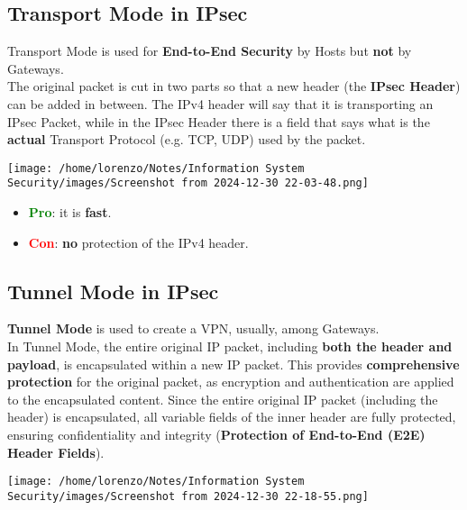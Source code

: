 \subsection{Transport Mode in IPsec}
\begin{minipage}{0.6\textwidth}
Transport Mode is used for \textbf{End-to-End Security} by Hosts but \textbf{not} by Gateways.\\
The original packet is cut in two parts so that a new header (the \textbf{IPsec Header}) can be added
in between. The IPv4 header will say that it is transporting an IPsec Packet, while in the IPsec
Header there is a field that says what is the \textbf{actual} Transport Protocol (e.g. TCP, UDP) used
by the packet. 
\end{minipage} 
\hspace{0.3cm}
\begin{minipage}{0.4\textwidth}
    \centering
    \texttt{[image: /home/lorenzo/Notes/Information System Security/images/Screenshot from 2024-12-30 22-03-48.png]}
\end{minipage}
\begin{itemize}
    \item \textcolor{green}{\textbf{Pro}}: it is \textbf{fast}.
    \item \textcolor{red}{\textbf{Con}}: \textbf{no} protection of the IPv4 header. 
\end{itemize}

\subsection{Tunnel Mode in IPsec}
\begin{minipage}{0.6\textwidth}
\textbf{Tunnel Mode} is used to create a VPN, usually, among Gateways.\\
In Tunnel Mode, the entire original IP packet, including \textbf{both the header and payload}, is encapsulated within a new IP packet. This provides \textbf{comprehensive protection} for the original packet, as encryption and authentication are applied to the encapsulated content.
Since the entire original IP packet (including the header) is encapsulated, all variable fields of
the inner header are fully protected, ensuring confidentiality and integrity (\textbf{Protection of End-to-End (E2E) Header Fields}). 
\end{minipage} 
\hspace{0.5cm}
\begin{minipage}{0.4\textwidth}
    \centering
    \texttt{[image: /home/lorenzo/Notes/Information System Security/images/Screenshot from 2024-12-30 22-18-55.png]}
\end{minipage}

